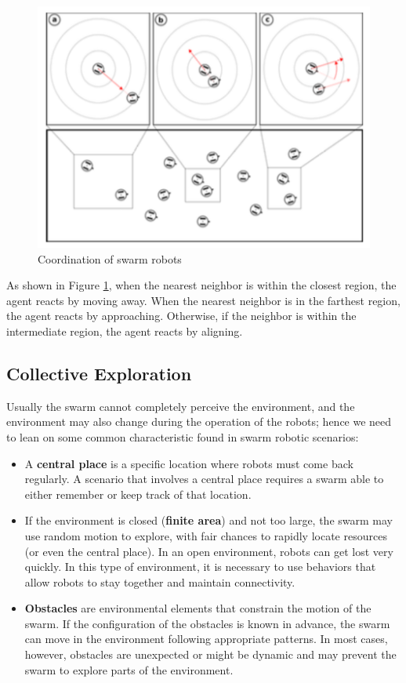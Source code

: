 \documentclass[10pt,a4paper]{article}
\begin{document}
\begin{figure}[t]
\centering
\includegraphics[scale=0.8]{images/coordination.png}
\caption{Coordination of swarm robots}
\label{fig:coordination}
\end{figure}

As shown in Figure \ref{fig:coordination}, when the nearest neighbor is within the closest region, the agent reacts by moving away. When the nearest neighbor is in the farthest region, the agent reacts by approaching. Otherwise, if the neighbor is within the intermediate region, the agent reacts by aligning.


\subsection{Collective Exploration}
Usually the swarm cannot completely perceive the environment, and the environment may also change during the operation of the robots; hence we need to lean on some common characteristic found in swarm robotic scenarios:
\begin{itemize}
\item A \textbf{central place} is a specific location where robots must come back regularly. A scenario that involves a central place requires a swarm able to either remember or keep track of that location.

\item If the environment is closed (\textbf{finite area}) and not too large, the swarm may use random motion to explore, with fair chances to rapidly locate resources (or even the central place). In an open environment, robots can get lost very quickly. In this type of environment, it is necessary to use behaviors that allow robots to stay together and maintain connectivity.

\item \textbf{Obstacles} are environmental elements that constrain the motion of the swarm. If the configuration of the obstacles is known in advance, the swarm can move in the environment following appropriate patterns. In most cases, however, obstacles are unexpected or might be dynamic and may prevent the swarm to explore parts of the environment.
\end{itemize}
\end{document}
